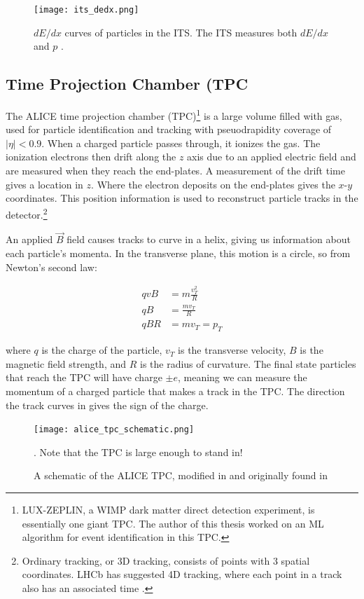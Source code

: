 \documentclass[../main.tex]{subfiles}
\begin{document}
\begin{figure}[h]
    \centering
    \texttt{[image: its\_dedx.png]}
    \caption{$dE/dx$ curves of particles in the ITS. The ITS measures both $dE/dx$ and $p$ \cite{ALICE:performance}.}
    \label{fig:its_dedx}
\end{figure}

\subsection{Time Projection Chamber (TPC} \label{section:tpc}
The ALICE time projection chamber (TPC)\footnote{LUX-ZEPLIN, a WIMP dark matter direct detection experiment, is essentially one giant TPC. The author of this thesis worked on an ML algorithm for event identification in this TPC.} is a large volume filled with gas, used for particle identification and tracking with pseuodrapidity coverage of $|\eta|<0.9$. When a charged particle passes through, it ionizes the gas. The ionization electrons then drift along the $z$ axis due to an applied electric field and are measured when they reach the end-plates. A measurement of the drift time gives a location in $z$. Where the electron deposits on the end-plates gives the $x$-$y$ coordinates. This position information is used to reconstruct particle tracks in the detector.\footnote{Ordinary tracking, or 3D tracking, consists of points with 3 spatial coordinates. LHCb has suggested 4D tracking, where each point in a track also has an associated time \cite{LHCb:upgrades}.}  

An applied $\vec{B}$ field causes tracks to curve in a helix, giving us information about each particle's momenta. In the transverse plane, this motion is a circle, so from Newton's second law:

\begin{align}
    qvB &= m\frac{v_T^2}{R} \\ 
    qB &= \frac{mv_T}{R} \\
    qBR &= mv_T = p_T
\end{align}

where $q$ is the charge of the particle, $v_T$ is the transverse velocity, $B$ is the magnetic field strength, and $R$ is the radius of curvature. The final state particles that reach the TPC will have charge $\pm e$, meaning we can measure the momentum of a charged particle that makes a track in the TPC. The direction the track curves in gives the sign of the charge. 

\begin{figure}[h]
    \centering
    \texttt{[image: alice\_tpc\_schematic.png]}
    \caption{A schematic of the ALICE TPC, modified in \cite{detectors} and originally found in \cite{ALICE:tpc}}. Note that the TPC is large enough to stand in!
\end{figure}
\end{document}
